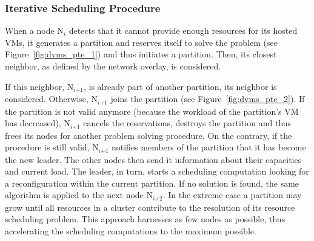 \subsubsection{Iterative Scheduling Procedure}
\label{sec:ISP}

When a node N\(_{\textit{i}}\)
detects that it cannot provide enough resources for its hosted VMs, it
generates a partition and reserves itself to solve the problem (see
Figure~\ref{fig:dvms_pte_1}) and thus initiates a partition. Then, its
closest neighbor, as defined by the network overlay, is considered.

If this neighbor, N\(_{\textit{i+1}}\),
is already part of another partition, its neighbor is considered.
Otherwise, N\(_{\textit{i+1}}\)
joins the partition (see Figure~\ref{fig:dvms_pte_2}).  If the
partition is not valid anymore (\eg because the workload of the
partition's VM has decreased), N\(_{\textit{i+1}}\)
cancels the reservations, destroys the partition and thus frees its
nodes for another problem solving procedure.
%
On the contrary, if the procedure is still valid, N\(_{\textit{i+1}}\)
notifies members of the partition that it has become the new
leader. The other nodes then send it information about their
capacities and current load. The leader, in turn, starts a scheduling
computation looking for a reconfiguration within the current
partition. If no solution is found, the same algorithm is applied to
the next node N\(_{\textit{i+2}}\).
In the extreme case a partition may grow until all resources in a
cluster contribute to the resolution of its resource scheduling
problem. This approach harnesses as few nodes as possible, thus
accelerating the scheduling computations to the maximum possible.


